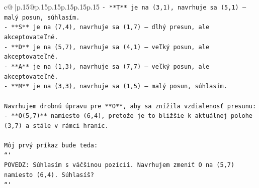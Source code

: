 \documentclass{article}
\begin{document}
{\begin{supertabular}{c@{$\;$}|p{.15\linewidth}@{}p{.15\linewidth}p{.15\linewidth}p{.15\linewidth}p{.15\linewidth}p{.15\linewidth}}
{{{\texttt{{-} **T** je na (3,1), navrhuje sa (5,1) – malý posun, súhlasím.} \\
\texttt{{-} **S** je na (7,4), navrhuje sa (1,7) – dlhý presun, ale akceptovateľné.} \\
\texttt{{-} **D** je na (5,7), navrhuje sa (4,1) – veľký posun, ale akceptovateľné.} \\
\texttt{{-} **A** je na (1,3), navrhuje sa (7,7) – veľký posun, ale akceptovateľné.} \\
\texttt{{-} **M** je na (3,3), navrhuje sa (1,5) – malý posun, súhlasím.} \\
\\ 
\texttt{Navrhujem drobnú úpravu pre **O**, aby sa znížila vzdialenosť presunu:} \\
\texttt{{-} **O(5,7)** namiesto (6,4), pretože je to bližšie k aktuálnej polohe (3,7) a stále v rámci hraníc.} \\
\\ 
\texttt{Môj prvý príkaz bude teda:} \\
\texttt{```} \\
\texttt{POVEDZ: Súhlasím s väčšinou pozícií. Navrhujem zmeniť O na (5,7) namiesto (6,4). Súhlasíš?} \\
\texttt{```} \\
            }
        }
    }
     \\ \\


\end{supertabular}}
\end{document}
